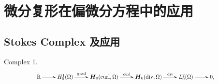 \chapter{微分复形在偏微分方程中的应用}


\section{Stokes Complex 及应用}
Complex 1.
\begin{equation}\label{CA10}
	\resizebox{0.8\hsize}{!}{$
		\begin{array}{c}
			\xymatrix{	
\mathbb{R} \ar[r] & H_0^1(\Omega)\ar[r]^-{\grad} & \boldsymbol{H}_0(\curl, \Omega)  \ar[r]^-{\curl}
				& \boldsymbol{H}_0(\div, \Omega)    \ar[r]^-{\div} & L_0^2(\Omega) \ar[r]^{} & 0 ,
 }
		\end{array}
		$}
	\end{equation}

